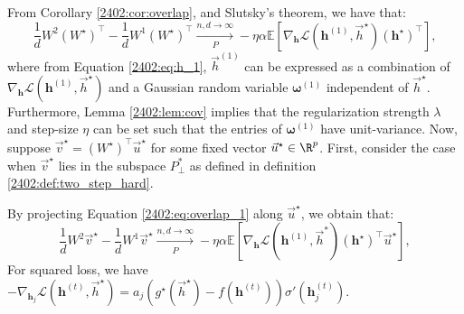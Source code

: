 From Corollary \ref{2402:cor:overlap}, and Slutsky's theorem, we have that:
\begin{equation}\label{2402:eq:overlap_1}
     \frac{1}{d} W^{2} (W^\star)^\top -  \frac{1}{d} W^{1} (W^\star)^\top\xrightarrow[P]{n,d \rightarrow \infty}- \eta \alpha \mathbb{E}\left[ \nabla_{\boldsymbol{h}} \mathcal{L}(\boldsymbol{h}^{(1)},\vec{h}^\star) \left( \boldsymbol{h}^\star \right)^\top\right],
\end{equation}
where from Equation \eqref{2402:eq:h_1}, $\vec{h}^{(1)}$ can be expressed as a combination of $\nabla_{\boldsymbol{h}} \mathcal{L}(\boldsymbol{h}^{(1)},\vec{h}^\star)$ and a Gaussian random variable $\boldsymbol{\omega}^{(1)}$ independent of 
$\vec{h}^\star$. Furthermore, Lemma \ref{2402:lem:cov} implies that the regularization strength $\lambda$ and step-size $\eta$ can be set such that the entries of $\boldsymbol{\omega}^{(1)}$ have unit-variance.
Now, suppose $\vec{v}^\star = (W^\star)^\top \vec{u}^\star$ for some fixed vector $\vec{u}^\star \in \R^p$. First, consider the case when  $\vec{v}^\star$ lies in the subspace $P^*_\perp$ as defined in definition \ref{2402:def:two_step_hard}. 


By projecting Equation \eqref{2402:eq:overlap_1} along $\vec{u}^\star$, we obtain that:
\begin{equation}\label{2402:eq:overlap_2}
     \frac{1}{d} W^{2}\vec{v}^\star  -  \frac{1}{d} W^{1}\vec{v}^\star \xrightarrow[P]{n,d \rightarrow \infty}- \eta \alpha \mathbb{E}\left[ \nabla_{\boldsymbol{h}} \mathcal{L}(\boldsymbol{h}^{(1)},\vec{h}^*) \left( \boldsymbol{h}^\star \right)^\top\vec{u}^\star\right],
\end{equation}
For squared loss, we have $-\nabla_{\boldsymbol{h}_j} \mathcal{L}(\boldsymbol{h}^{(t)},\vec{h}^\star) = a_j(g^\star(\vec{h}^\star)-f(\boldsymbol{h}^{(t)}))\sigma'(\boldsymbol{h}^{(t)}_j)$.

